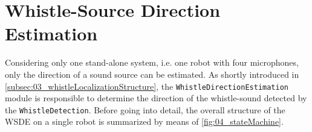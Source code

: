 \section{Whistle-Source Direction Estimation} 
\label{subsec:03_directionEstimation}

Considering only one stand-alone system, i.e. one robot with four microphones,
only the direction of a sound source can be
estimated.
As shortly introduced in \cref{subsec:03_whistleLocalizationStructure},
the \lstinline!WhistleDirectionEstimation! module is responsible to
determine the direction of the whistle-sound detected by the \lstinline!WhistleDetection!.
Before going into detail, the overall structure of the \ac{WSDE} on a single robot
is summarized by means of \cref{fig:04_stateMachine}.

